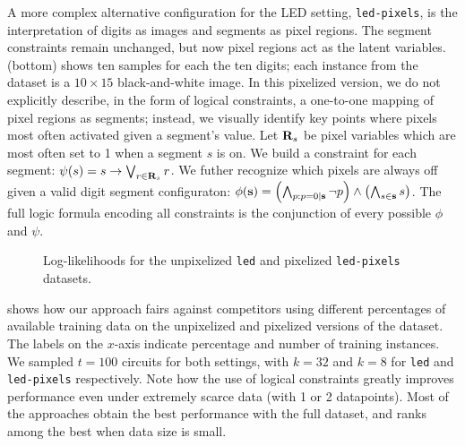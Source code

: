 A more complex alternative configuration for the LED setting, \texttt{led-pixels}, is the
interpretation of digits as images and segments as pixel regions. The segment constraints remain
unchanged, but now pixel regions act as the latent variables.  (bottom) shows ten samples
for each the ten digits; each instance from the dataset is a $10\times 15$ black-and-white image.
In this pixelized version, we do not explicitly describe, in the form of logical constraints, a
one-to-one mapping of pixel regions as segments; instead, we visually identify key points where
pixels most often activated given a segment's value. Let $\mathbf{R}_s$ be pixel variables which are
most often set to 1 when a segment $s$ is on. We build a constraint for each segment: $\psi(s)=s\to
\bigvee_{r\in\mathbf{R}_s} r$. We futher recognize which pixels are always off given a valid digit
segment configuraton: $\phi(\mathbf{s})=\left(\bigwedge_{p:p=0|\mathbf{s}} \neg p\right)\wedge\left(
\bigwedge_{s\in\mathbf{s}} s\right)$. The full logic formula encoding all constraints is the
conjunction of every possible $\phi$ and $\psi$.


\begin{figure}[t]
  \begin{subfigure}{0.495\textwidth}
    \caption{}
    \label{fig:ll-led}
  \end{subfigure}
  \begin{subfigure}{0.495\textwidth}
    \caption{}
    \label{fig:ll-led-pixels}
  \end{subfigure}
  \caption{Log-likelihoods for the unpixelized \texttt{led}  and pixelized
    \texttt{led-pixels}  datasets.}
  \label{fig:ll-led-all}
\end{figure}

 shows how our approach fairs against competitors using different percentages
of available training data on the unpixelized and pixelized versions of the dataset. The labels on
the $x$-axis indicate percentage and number of training instances. We sampled $t=100$ circuits for
both settings, with $k=32$ and $k=8$ for \texttt{led} and \texttt{led-pixels} respectively. Note
how the use of logical constraints greatly improves performance even under extremely scarce data
(with 1 or 2 datapoints). Most of the  approaches obtain the best performance
with the full dataset, and ranks among the best when data size is small.

